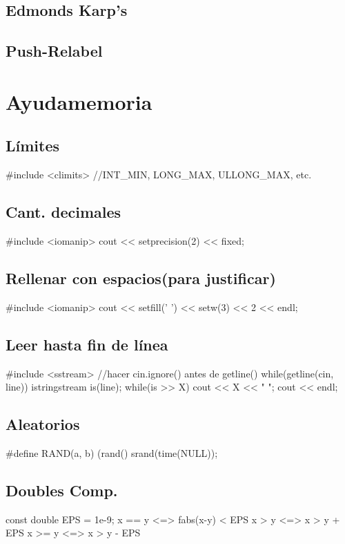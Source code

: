\subsection{Edmonds Karp’s}
\subsection{Push-Relabel}
\section{Ayudamemoria}%
\subsection*{Límites}
\begin{code}
#include <climits> //INT_MIN, LONG_MAX, ULLONG_MAX, etc.
\end{code}
\subsection*{Cant. decimales}
\begin{code}
#include <iomanip>
cout << setprecision(2) << fixed;
\end{code}
\subsection*{Rellenar con espacios(para justificar)}
\begin{code}
#include <iomanip>
cout << setfill(' ') << setw(3) << 2 << endl;
\end{code}
\subsection*{Leer hasta fin de línea}
\begin{code}
#include <sstream>
//hacer cin.ignore() antes de getline()
while(getline(cin, line)){
   	 istringstream is(line);
   	 while(is >> X)
   		 cout << X << " ";
   	 cout << endl;
}
\end{code}
\subsection*{Aleatorios}
\begin{code}
#define RAND(a, b) (rand()%
srand(time(NULL));
\end{code}
\subsection*{Doubles Comp.}
\begin{code}
const double EPS = 1e-9;
x == y	<=> fabs(x-y) < EPS
x >  y	<=> x > y + EPS
x >= y	<=> x > y - EPS
\end{code}
